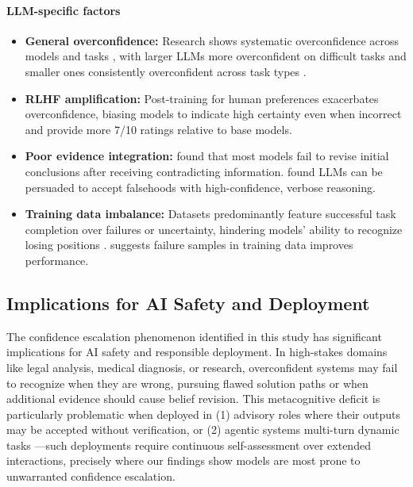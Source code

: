 \documentclass{article}
\begin{document}
\paragraph{LLM-specific factors}
\begin{itemize}
    \item \textbf{General overconfidence:} Research shows systematic overconfidence across models and tasks \citep{chhikara2025mindconfidencegapoverconfidence,xiong2024uncertainty}, with larger LLMs more overconfident on difficult tasks and smaller ones consistently overconfident across task types \citep{wen2024from}.

    \item \textbf{RLHF amplification:} Post-training for human preferences exacerbates overconfidence, biasing models to indicate high certainty even when incorrect \citep{leng2025tamingoverconfidencellmsreward} and provide more 7/10 ratings \citep{west2025basemodelsbeataligned,openai2024gpt4technicalreport} relative to base models.

    \item \textbf{Poor evidence integration:} \citet{wilie2024beliefrevisionadaptabilitylarge} found that most models fail to revise initial conclusions after receiving contradicting information. \citet{agarwal2025persuasionoverridestruthmultiagent} found LLMs can be persuaded to accept falsehoods with high-confidence, verbose reasoning.

    \item \textbf{Training data imbalance:} Datasets predominantly feature successful task completion over failures or uncertainty, hindering models' ability to recognize losing positions \citep{zhou2023navigatinggreyareaexpressions}. \citet{chung2025learningfailuresmultiattemptreinforcement} suggests failure samples in training data improves performance.
\end{itemize}

\subsection{Implications for AI Safety and Deployment}

The confidence escalation phenomenon identified in this study has significant implications for AI safety and responsible deployment. In high-stakes domains like legal analysis, medical diagnosis, or research, overconfident systems may fail to recognize when they are wrong, pursuing flawed solution paths or when additional evidence should cause belief revision. This metacognitive deficit is particularly problematic when deployed in (1) advisory roles where their outputs may be accepted without verification, or (2) agentic systems multi-turn dynamic tasks —such deployments require continuous self-assessment over extended interactions, precisely where our findings show models are most prone to unwarranted confidence escalation.
\end{document}
